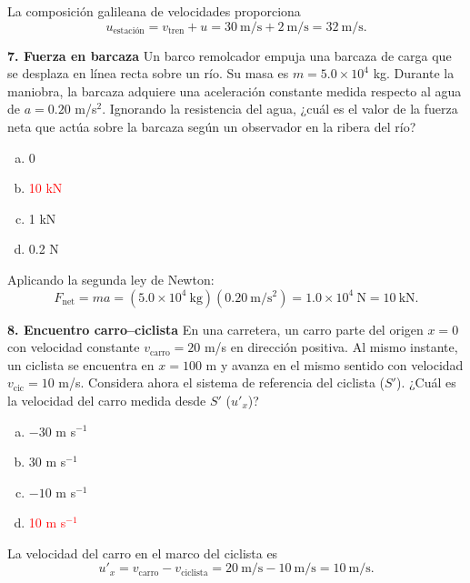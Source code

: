 

La composición galileana de velocidades proporciona
\[
u_{\text{estación}}
=v_{\text{tren}}+u
=30\ \mathrm{m/s}+2\ \mathrm{m/s}
=\boxed{32\ \mathrm{m/s}}.
\]

\textbf{7. Fuerza en barcaza}
Un barco remolcador empuja una barcaza de carga que se desplaza en línea recta sobre un río. Su masa es $m = 5.0 \times 10^4$ kg. Durante la maniobra, la barcaza adquiere una aceleración constante medida respecto al agua de $a = 0.20$ m/s$^2$. Ignorando la resistencia del agua, ¿cuál es el valor de la fuerza neta que actúa sobre la barcaza según un observador en la ribera del río?
\begin{enumerate}[a)]
    \item 0
    \item \textcolor{red}{10 kN}
    \item 1 kN
    \item 0.2 N
\end{enumerate}



Aplicando la segunda ley de Newton:
\[
F_{\text{net}}=ma
=(5.0\times10^4\ \mathrm{kg})(0.20\ \mathrm{m/s^2})
=1.0\times10^4\ \mathrm{N}
=\boxed{10\ \mathrm{kN}}.
\]

\textbf{8. Encuentro carro--ciclista}
En una carretera, un carro parte del origen $x=0$ con velocidad constante $v_{\text{carro}} = 20$ m/s en dirección positiva. Al mismo instante, un ciclista se encuentra en $x=100$ m y avanza en el mismo sentido con velocidad $v_{\text{cic}} = 10$ m/s. Considera ahora el sistema de referencia del ciclista ($S'$). ¿Cuál es la velocidad del carro medida desde $S'$ ($u'_x$)?
\begin{enumerate}[a)]
    \item $-30$ m s$^{-1}$
    \item $30$ m s$^{-1}$
    \item $-10$ m s$^{-1}$
    \item \textcolor{red}{10 m s$^{-1}$}
\end{enumerate}



La velocidad del carro en el marco del ciclista es
\[
u'_x=v_{\text{carro}}-v_{\text{ciclista}}
=20\ \mathrm{m/s}-10\ \mathrm{m/s}
=\boxed{10\ \mathrm{m/s}}.
\]

